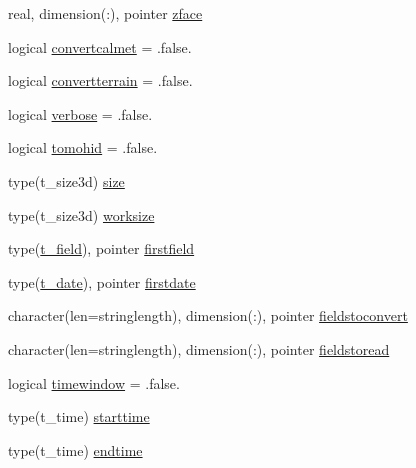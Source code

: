 \begin{DoxyCompactItemize}
\item 
real, dimension(\+:), pointer \mbox{\hyperlink{structmodulecalmetformat_1_1t__calmetformat_a38045d0633b05dafbd28897e8983f683}{zface}}
\item 
logical \mbox{\hyperlink{structmodulecalmetformat_1_1t__calmetformat_a217bcf5fa463c80c45df6954ebc0f857}{convertcalmet}} = .false.
\item 
logical \mbox{\hyperlink{structmodulecalmetformat_1_1t__calmetformat_aee7869c53b5528ad526669115f401f73}{convertterrain}} = .false.
\item 
logical \mbox{\hyperlink{structmodulecalmetformat_1_1t__calmetformat_a5d15d2207ca77b3fa44a5c6ac8b744f0}{verbose}} = .false.
\item 
logical \mbox{\hyperlink{structmodulecalmetformat_1_1t__calmetformat_a99d30d46e7b8771639fc79fb4d363998}{tomohid}} = .false.
\item 
type(t\+\_\+size3d) \mbox{\hyperlink{structmodulecalmetformat_1_1t__calmetformat_ad2f3b6aa50712aa3a89091c4f33a4487}{size}}
\item 
type(t\+\_\+size3d) \mbox{\hyperlink{structmodulecalmetformat_1_1t__calmetformat_a01e232f6ef8a2de3c181de5afcc30e2c}{worksize}}
\item 
type(\mbox{\hyperlink{structmodulecalmetformat_1_1t__field}{t\+\_\+field}}), pointer \mbox{\hyperlink{structmodulecalmetformat_1_1t__calmetformat_a7a541fa75fd9e8ed478acfd737d662b7}{firstfield}}
\item 
type(\mbox{\hyperlink{structmodulecalmetformat_1_1t__date}{t\+\_\+date}}), pointer \mbox{\hyperlink{structmodulecalmetformat_1_1t__calmetformat_add59283b0b0430a01eec4c13304dc25a}{firstdate}}
\item 
character(len=stringlength), dimension(\+:), pointer \mbox{\hyperlink{structmodulecalmetformat_1_1t__calmetformat_a6e0b4ddbb511fbaf5bf92a044fba6b1b}{fieldstoconvert}}
\item 
character(len=stringlength), dimension(\+:), pointer \mbox{\hyperlink{structmodulecalmetformat_1_1t__calmetformat_a531b3f78a33ae5dcaa5fe615dae7051d}{fieldstoread}}
\item 
logical \mbox{\hyperlink{structmodulecalmetformat_1_1t__calmetformat_aa4d30b0e34665214d8acbd947d1c86bc}{timewindow}} = .false.
\item 
type(t\+\_\+time) \mbox{\hyperlink{structmodulecalmetformat_1_1t__calmetformat_a9a92f1e1ec8ea3dfc542c907e996585c}{starttime}}
\item 
type(t\+\_\+time) \mbox{\hyperlink{structmodulecalmetformat_1_1t__calmetformat_a7e1dc830410d52386315ae4e1255cae2}{endtime}}

\end{DoxyCompactItemize}
